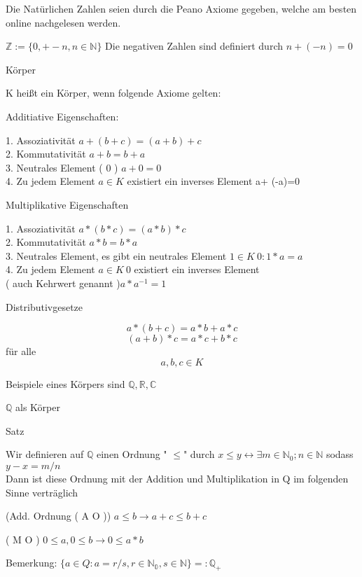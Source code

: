 \documentclass[smallheadings,headsepline,12pt,a4paper]{scrartcl}
\begin{document}
\itemize
\item


\item Die Natürlichen Zahlen seien durch die Peano Axiome gegeben, welche am besten online nachgelesen werden.
\item $\mathbb{Z} := \{0, +-n , n \in \mathbb{N}\} $ Die negativen Zahlen sind definiert durch $n+(-n)=0$

\begin{center}
\item[Körper]
\end{center}
\item K heißt ein Körper, wenn folgende Axiome gelten:
\begin{center}
\item[Additiative Eigenschaften:] 
\end{center}
1. Assoziativität $ a+(b+c) = (a+b)+c $ \\
2. Kommutativität $ a+b = b+a $ \\
3. Neutrales Element ( 0 ) $ a+0=0$\\
4. Zu jedem Element $a \in K $ existiert ein inverses Element a+ (-a)=0
\begin{center}
\item[Multiplikative Eigenschaften]
\end{center}
1. Assoziativität $ a*(b*c) = (a*b)*c $ \\
2. Kommutativität $ a*b = b*a $ \\
3. Neutrales Element, es gibt ein neutrales Element $ 1 \in K \ {0} : 1* a = a $\\
4. Zu jedem Element $a \in K \ {0} $ existiert ein inverses Element \\
( auch Kehrwert genannt )$a * a^{-1} = 1 $
\begin{center}
\item[Distributivgesetze]
\end{center}
\item $$ a*(b+c) = a*b + a*c $$
$$ (a+b)*c = a*c + b*c $$ für alle $$a,b,c \in K $$
\item Beispiele eines Körpers sind $ \mathbb{Q} , \mathbb{R} , \mathbb{C} $

\item[$\mathbb{Q}$ als Körper]
\item[Satz]
\item Wir definieren auf $\mathbb{Q}$ einen Ordnung " $\leq $" durch $x \leq y \leftrightarrow \exists m \in \mathbb{N}_0 ; n \in \mathbb{N} $ sodass $ y-x = m/n $ \\
Dann ist diese Ordnung mit der Addition und Multiplikation in Q im folgenden Sinne verträglich 
\item (Add. Ordnung ( A O )) $ a \leq b \rightarrow a+c \leq b+c $
\item ( M O ) $ 0 \leq a , 0 \leq b \rightarrow 0 \leq a*b $
\item Bemerkung: $\{a \in Q : a = r/s ,  r \in \mathbb{N_0}, s\in \mathbb{N}\}=: \mathbb{Q}_+$
\end{document}

